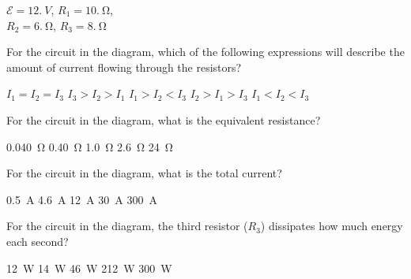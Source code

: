 \documentclass{../../../oss-classkick-exam}
\begin{document}
\begin{multicols*}{2}
\begin{questions}
{\begin{center}
        \vspace{.1in}$\mathcal{E}=\SI{12.}{V}$, $R_1=\SI{10.}{\ohm}$,\\
        $R_2=\SI{6.}{\ohm}$, $R_3=\SI{8.}{\ohm}$
      \end{center}
    }
    
    \question For the circuit in the diagram, which of the following
    expressions will describe the amount of current flowing through the
    resistors?
    \label{parallel1}
    \begin{choices}
      \choice $I_1=I_2=I_3$
      \choice $I_3>I_2>I_1$
      \choice $I_1>I_2<I_3$
      \choice $I_2>I_1>I_3$
      \choice $I_1<I_2<I_3$
    \end{choices}
    
    \question For the circuit in the diagram, what is the equivalent resistance?
    \begin{choices}
      \choice\SI{0.040}{\ohm}
      \choice\SI{0.40}{\ohm}
      \choice\SI{1.0}{\ohm}
      \choice\SI{2.6}{\ohm}
      \choice\SI{24}{\ohm}
    \end{choices}
    
    \question For the circuit in the diagram, what is the total current?
    \begin{choices}
      \choice\SI{0.5}{\ampere}
      \choice\SI{4.6}{\ampere}
      \choice\SI{12}{\ampere}
      \choice\SI{30}{\ampere}
      \choice\SI{300}{\ampere}
    \end{choices}
    
    \question For the circuit in the diagram, the third resistor ($R_3$)
    dissipates how much energy each second?
    \label{parallel4}
    \begin{choices}
      \choice\SI{12}{\watt}
      \choice\SI{14}{\watt}
      \choice\SI{46}{\watt}
      \choice\SI{212}{\watt}
      \choice\SI{300}{\watt}
    \end{choices}
    \newpage
    
%


\end{questions}
\end{multicols*}
\end{document}
